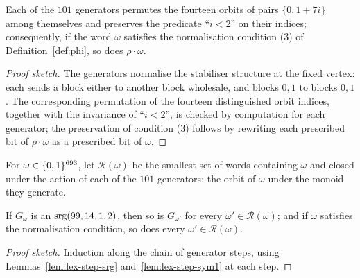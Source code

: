 \begin{lemma}\label{lem:lex-step-sym1}
Each of the $101$ generators permutes the fourteen orbits of pairs
$\{0, 1+7i\}$ among themselves and preserves the predicate ``$i < 2$'' on
their indices; consequently, if the word $\omega$ satisfies the
normalisation condition (3) of Definition~\ref{def:phi}, so does
$\rho\cdot\omega$.
\leanok
{}
\end{lemma}

\begin{proof}[Proof sketch]
The generators normalise the stabiliser structure at the fixed vertex: each
sends a block either to another block wholesale, and blocks $0,1$ to blocks
$0,1$.  The corresponding permutation of the fourteen distinguished orbit
indices, together with the invariance of ``$i<2$'', is checked by
computation for each generator; the preservation of condition (3) follows by
rewriting each prescribed bit of $\rho\cdot\omega$ as a prescribed bit of
$\omega$.
\end{proof}

\begin{definition}[Reachability]\label{def:lex-reach}
For $\omega \in \{0,1\}^{693}$, let $\mathcal{R}(\omega)$ be the smallest set
of words containing $\omega$ and closed under the action of each of the
$101$ generators: the orbit of $\omega$ under the monoid they generate.
\leanok
{}
\end{definition}

\begin{lemma}\label{lem:lex-reach-inv}
If $G_\omega$ is an $\mathrm{srg}(99,14,1,2)$, then so is $G_{\omega'}$ for every
$\omega' \in \mathcal{R}(\omega)$; and if $\omega$ satisfies the
normalisation condition, so does every $\omega' \in \mathcal{R}(\omega)$.
\leanok
{}
\end{lemma}

\begin{proof}[Proof sketch]
Induction along the chain of generator steps, using
Lemmas~\ref{lem:lex-step-srg} and~\ref{lem:lex-step-sym1} at each step.
\end{proof}

